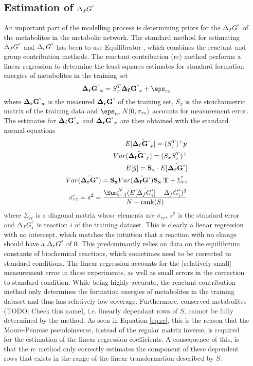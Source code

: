 \documentclass[10pt,letterpaper]{article}
\newcommand{\sdgf}{\Delta_fG^{\degree}}
\newcommand{\sdgr}{\Delta_rG^{\degree}}
\newcommand{\bsdgf}{\mathbf{\sdgf}}
\newcommand{\bsdgr}{\mathbf{\sdgr}}
\begin{document}
\subsection{Estimation of $\sdgf$} \label{sec:sdgf_estimation}

An important part of the modelling process is determining priors for the $\sdgf$ of the metabolites in the metabolic network.
The standard method for estimating $\sdgf$ and $\sdgr$ has been to use Equilibrator \cite{noor_2013_equilibrator}, which combines the reactant and group contribution methods.
The reactant contribution (rc) method performs a linear regression to determine the least squares estimates for standard formation energies of metabolites in the training set
\[
    \label{eq:rc}
    \mathbf{\bsdgr_x} = S_x^T\bsdgf_x + \eps_{rc}
\]
where $\mathbf{\bsdgr_x}$ is the measured $\bsdgr$ of the training set, $S_x$ is the stoichiometric matrix of the training data and $\eps_{rc} ~ N(0, \sigma_{rc})$ accounts for measurement error. %
The estimates for $\bsdgf_x$ and $\bsdgr_x$ are then obtained with the standard normal equations
\begin{align}
    E[\hat{\bsdgf_x}] = (S_x^T)^+ \mathbf{y}\\
    Var(\hat{\bsdgf_x}) = (S_x S_x^T)^+ \\
    E[\hat{y}] = \mathbf{S_x} \cdot E[\hat{\bsdgf}] \\
    Var(\hat{\bsdgr}) = \mathbf{S_x} Var(\hat{\bsdgf}) \mathbf{S_x.T} + \hat{\Sigma_{rc}} \\
    \hat{\sigma_{rc}} = s^2 = \frac{\Sum_{i=1}^{N} (E[\hat{\sdgf_i}] - \sdgf_i)^2}{N-\text{rank}(S)}
\end{align}
where $\Sigma_{rc}$ is a diagonal matrix whose elements are $\sigma_{rc}$, $s^2$ is the standard error and $\sdgf_i$ is reaction $i$ of the training dataset.
This is clearly a lienar regression with no intercept, which matches the intuition that a reaction with no change should have a $\sdgr$ of 0.
This predominantly relies on data on the equilibrium constants of biochemical reactions, which sometimes need to be corrected to standard conditions. %
The linear regression accounts for the (relatively small) measurement error in these experiments, as well as small errors in the correction to standard condition. %
While being highly accurate, the reactant contribution method only determines the formation energies of metabolites in the training dataset and thus has relatively low coverage.
Furthermore, conserved metabolites (TODO: Check this name), i.e. linearly dependant rows of $S$, cannot be fully determined by the method.
As seen in Equation \ref{eq:rc}, this is the reason that the Moore-Penrose pseudoinverse, instead of the regular matrix inverse, is required for the estimation of the linear regression coefficients.
A consequence of this, is that the rc method only correctly estimates the component of these dependent rows that exists in the range of the linear transformation described by $S$.
\end{document}
